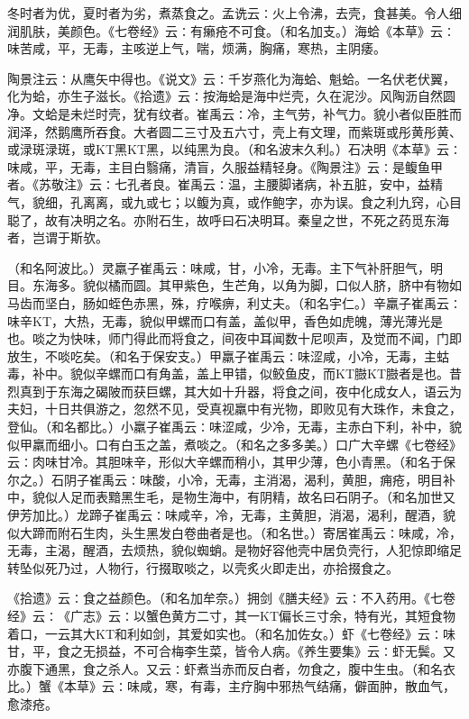 \documentclass[a4paper,12pt,UTF8,twoside]{ctexbook}
\begin{document}
冬时者为优，夏时者为劣，煮蒸食之。孟诜云∶火上令沸，去壳，食甚美。令人细润肌肤，美颜色。《七卷经》云∶有癞疮不可食。（和名加支。）海蛤《本草》云∶味苦咸，平，无毒，主咳逆上气，喘，烦满，胸痛，寒热，主阴痿。

陶景注云∶从鹰矢中得也。《说文》云∶千岁燕化为海蛤、魁蛤。一名伏老伏翼，化为蛤，亦生子滋长。《拾遗》云∶按海蛤是海中烂壳，久在泥沙。风陶沥自然圆净。文蛤是未烂时壳，犹有纹者。崔禹云∶冷，主气劳，补气力。貌小者似臣胜而润泽，然鹅鹰所吞食。大者圆二三寸及五六寸，壳上有文理，而紫斑或彤黄彤黄、或渌斑渌斑，或KT黑KT黑，以纯黑为良。（和名波末久利。）石决明《本草》云∶味咸，平，无毒，主目白翳痛，清盲，久服益精轻身。《陶景注》云∶是鳆鱼甲者。《苏敬注》云∶七孔者良。崔禹云∶温，主腰脚诸病，补五脏，安中，益精气，貌细，孔离离，或九或七；以鳆为真，或作鲍字，亦为误。食之利九窍，心目聪了，故有决明之名。亦附石生，故呼曰石决明耳。秦皇之世，不死之药觅东海者，岂谓于斯欤。

（和名阿波比。）灵羸子崔禹云∶味咸，甘，小冷，无毒。主下气补肝胆气，明目。东海多。貌似橘而圆。其甲紫色，生芒角，以角为脚，口似人脐，脐中有物如马齿而坚白，肠如蛭色赤黑，殊，疗喉痹，利丈夫。（和名宇仁。）辛羸子崔禹云∶味辛KT，大热，无毒，貌似甲螺而口有盖，盖似甲，香色如虎魄，薄光薄光是也。啖之为快味，师门得此而将食之，间夜中耳闻数十尼呗声，及觉而不闻，门即放生，不啖吃矣。（和名于保安支。）甲羸子崔禹云∶味涩咸，小冷，无毒，主蛄毒，补中。貌似辛螺而口有角盖，盖上甲错，似鲛鱼皮，而KT臌KT臌者是也。昔烈真到于东海之碣陂而获巨螺，其大如十升器，将食之间，夜中化成女人，语云为夫妇，十日共俱游之，忽然不见，受真视羸中有光物，即败见有大珠作，未食之，登仙。（和名都比。）小羸子崔禹云∶味涩咸，少冷，无毒，主赤白下利，补中，貌似甲羸而细小。口有白玉之盖，煮啖之。（和名之多多美。）口广大辛螺《七卷经》云∶肉味甘冷。其胆味辛，形似大辛螺而稍小，其甲少薄，色小青黑。（和名于保尔之。）石阴子崔禹云∶味酸，小冷，无毒，主消渴，渴利，黄胆，痈疮，明目补中，貌似人足而表黯黑生毛，是物生海中，有阴精，故名曰石阴子。（和名加世又伊芳加比。）龙蹄子崔禹云∶味咸辛，冷，无毒，主黄胆，消渴，渴利，醒酒，貌似大蹄而附石生肉，头生黑发白卷曲者是也。（和名世。）寄居崔禹云∶味咸，冷，无毒，主渴，醒酒，去烦热，貌似蜘蛸。是物好容他壳中居负壳行，人犯惊即缩足转坠似死乃过，人物行，行掇取啖之，以壳炙火即走出，亦拾掇食之。

《拾遗》云∶食之益颜色。（和名加牟奈。）拥剑《膳夫经》云∶不入药用。《七卷经》云∶《广志》云∶以蟹色黄方二寸，其一KT偏长三寸余，特有光，其短食物着口，一云其大KT和利如剑，其爱如实也。（和名加佐女。）虾《七卷经》云∶味甘，平，食之无损益，不可合梅李生菜，皆令人病。《养生要集》云∶虾无鬓。又亦腹下通黑，食之杀人。又云∶虾煮当赤而反白者，勿食之，腹中生虫。（和名衣比。）蟹《本草》云∶味咸，寒，有毒，主疗胸中邪热气结痛，僻面肿，散血气，愈漆疮。
\end{document}
